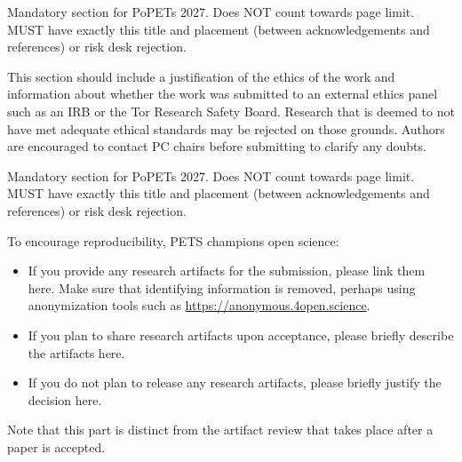 \documentclass[sigconf,anonymous,review]{acmart}
\begin{document}
\begin{ethics}
Mandatory section for PoPETs 2027. Does NOT count towards page limit. MUST have
exactly this title and placement (between acknowledgements and references) or
risk desk rejection.

This section should include a justification of the ethics of the work and
information about whether the work was submitted to an external ethics panel
such as an IRB or the Tor Research Safety Board. Research that is deemed to not
have met adequate ethical standards may be rejected on those grounds. Authors
are encouraged to contact PC chairs before submitting to clarify any doubts.
\end{ethics}

\begin{openscience}
Mandatory section for PoPETs 2027. Does NOT count towards page limit. MUST have
exactly this title and placement (between acknowledgements and references) or
risk desk rejection.

To encourage reproducibility, PETS champions open science:
\begin{itemize}
  \item If you provide any research artifacts for the submission, please link
  them here. Make sure that identifying information is removed, perhaps using
  anonymization tools such as \url{https://anonymous.4open.science}.
  \item If you plan to share research artifacts upon acceptance, please briefly
  describe the artifacts here.
  \item If you do not plan to release any research artifacts, please briefly
  justify the decision here.
\end{itemize}

Note that this part is distinct from the artifact review that takes place after
a paper is accepted.
\end{openscience}
\end{document}
